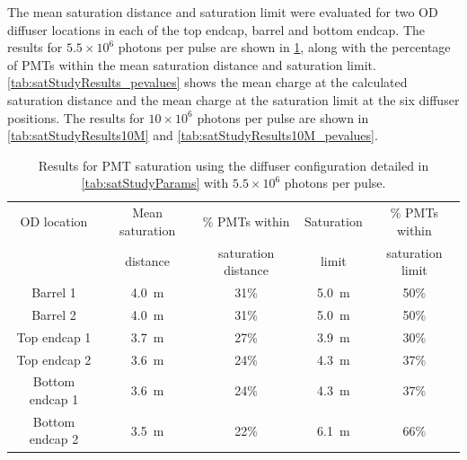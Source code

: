 \documentclass[a4paper,11pt]{article}
\begin{document}
The mean saturation distance and saturation limit were evaluated for two OD diffuser locations in each of the top endcap, barrel and bottom endcap. The results for $5.5\times10^6$ photons per pulse are shown in \cref{tab:satStudyResults}, along with the percentage of PMTs within the mean saturation distance and saturation limit. \cref{tab:satStudyResults_pevalues} shows the mean charge at the calculated saturation distance and the mean charge at the saturation limit at the six diffuser positions. The results for $10\times10^6$ photons per pulse are shown in \cref{tab:satStudyResults10M} and \cref{tab:satStudyResults10M_pevalues}.
\begin{table}[ht!]
    \centering
    \begin{tabular}{|c|c|c|c|c|}
    \hline
        OD location & Mean saturation & \% PMTs within & Saturation  & \% PMTs within \\
                    &  distance & saturation distance & limit &  saturation limit\\
        \hline
        Barrel 1        & 4.0~m & 31\%        & 5.0~m   & 50\% \\
        Barrel 2        & 4.0~m    & 31\%     & 5.0~m   & 50\% \\
		Top endcap 1    & 3.7~m  & 27\%       & 3.9~m & 30\% \\
        Top endcap 2    & 3.6~m  & 24\%       & 4.3~m & 37\% \\ 
		Bottom endcap 1 & 3.6~m  & 24\%       & 4.3~m & 37\% \\
		Bottom endcap 2 & 3.5~m  & 22\%       & 6.1~m & 66\% \\
        \hline
    \end{tabular}
    \caption{Results for PMT saturation using the diffuser configuration detailed in \cref{tab:satStudyParams} with $5.5\times10^6$ photons per pulse.}
    \label{tab:satStudyResults}
\end{table}
%
\end{document}
